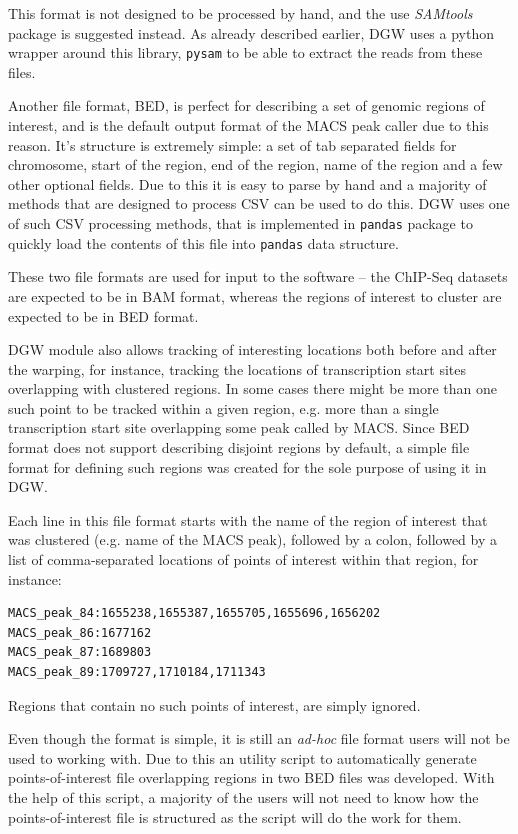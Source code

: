 \documentclass[parskip]{cs4rep}
\newcommand{\pythonpackage}[1]{{\tt #1}}
\begin{document}
This format is not designed to be processed by hand, and the use \emph{SAMtools} package is suggested instead. As already described earlier, DGW uses a python wrapper around this library, \pythonpackage{pysam} to be able to extract the reads from these files.

Another file format, BED, is perfect for describing a set of genomic regions of interest, and is the default output format of the MACS peak caller due to this reason. It's structure is extremely simple: a set of tab separated fields for chromosome, start of the region, end of the region, name of the region and a few other optional fields. Due to this it is easy to parse by hand and a majority of methods that are designed to process CSV can be used to do this. 
DGW uses one of such CSV processing methods, that is implemented in \pythonpackage{pandas} package to quickly load the contents of this file into \pythonpackage{pandas} data structure.

These two file formats are used for input to the software -- the ChIP-Seq datasets are expected to be in BAM format, whereas the regions of interest to cluster are expected to be in BED format.

DGW module also allows tracking of interesting locations both before and after the warping, for instance, tracking the locations of transcription start sites overlapping with clustered regions. In some cases there might be more than one such point to be tracked within a given region, e.g. more than a single transcription start site overlapping some peak called by MACS. Since BED format does not support describing disjoint regions by default, a simple file format for defining such regions was created for the sole purpose of using it in DGW. 

Each line in this file format starts with the name of the region of interest that was clustered (e.g. name of the MACS peak), followed by a colon, followed by a list of comma-separated locations of points of interest within that region, for instance:

\begin{verbatim}
MACS_peak_84:1655238,1655387,1655705,1655696,1656202
MACS_peak_86:1677162
MACS_peak_87:1689803
MACS_peak_89:1709727,1710184,1711343
\end{verbatim}

Regions that contain no such points of interest, are simply ignored.

Even though the format is simple, it is still an \emph{ad-hoc} file format users will not be used to working with. Due to this an utility script to automatically generate points-of-interest file overlapping regions in two BED files was developed. With the help of this script, a majority of the users will not need to know how the points-of-interest file is structured as the script will do the work for them.
\end{document}
